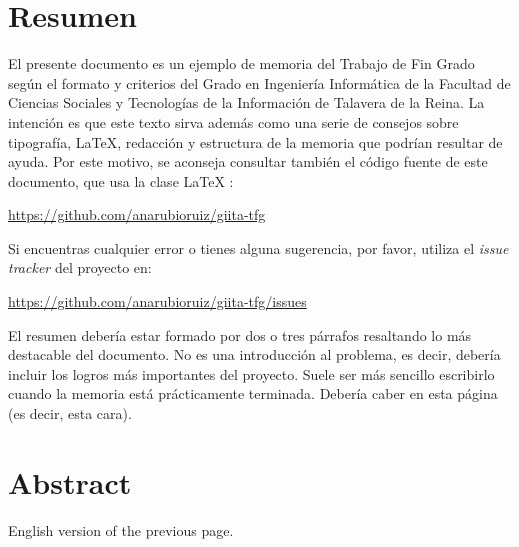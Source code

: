 \chapter{Resumen}

El presente documento es un ejemplo de memoria del Trabajo de Fin Grado según el formato y criterios del Grado en Ingeniería Informática de la Facultad de Ciencias Sociales y Tecnologías de la Información de Talavera de la Reina. La intención es que este texto sirva además como una serie de consejos sobre tipografía, \LaTeX, redacción y estructura de la memoria que podrían resultar de ayuda. Por este motivo, se aconseja consultar también el código fuente de este documento, que usa la clase \LaTeX{} \giitatfg{}:

 \url{https://github.com/anarubioruiz/giita-tfg}

Si encuentras cualquier error o tienes alguna sugerencia, por favor, utiliza el \emph{issue tracker} del proyecto \giitatfg{} en:

\url{https://github.com/anarubioruiz/giita-tfg/issues}

El resumen debería estar formado por dos o tres párrafos resaltando lo más destacable del documento. No es una introducción al problema, es decir, debería incluir los logros más importantes del proyecto. Suele ser más sencillo escribirlo cuando la memoria está prácticamente terminada. Debería caber en esta página (es decir, esta cara).


\chapter{Abstract}

English version of the previous page.
